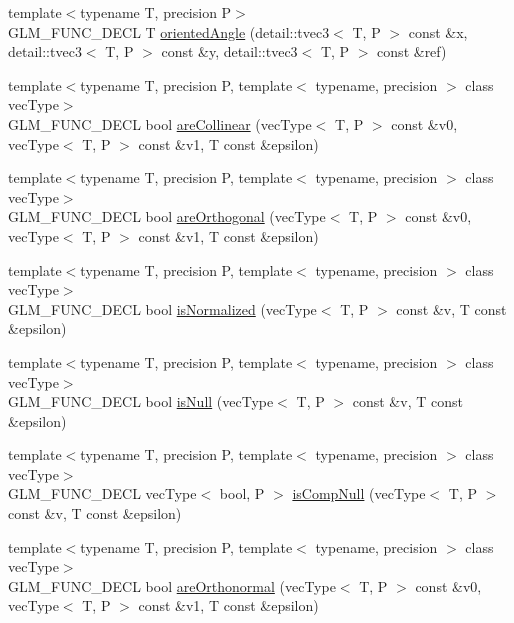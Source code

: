 \begin{CompactItemize}
\item 
{\footnotesize template$<$typename T, precision P$>$ }\\GLM\_\-FUNC\_\-DECL T \hyperlink{group__gtx__vector__angle_gc56a6bdc5d430b476514d64cb185b772}{orientedAngle} (detail::tvec3$<$ T, P $>$ const \&x, detail::tvec3$<$ T, P $>$ const \&y, detail::tvec3$<$ T, P $>$ const \&ref)
\item 
{\footnotesize template$<$typename T, precision P, template$<$ typename, precision $>$ class vecType$>$ }\\GLM\_\-FUNC\_\-DECL bool \hyperlink{group__gtx__vector__query_gbfc6fa0b52f1ad33ffe31d41535f7069}{areCollinear} (vecType$<$ T, P $>$ const \&v0, vecType$<$ T, P $>$ const \&v1, T const \&epsilon)
\item 
{\footnotesize template$<$typename T, precision P, template$<$ typename, precision $>$ class vecType$>$ }\\GLM\_\-FUNC\_\-DECL bool \hyperlink{group__gtx__vector__query_g9af1cd34fdb7c3cdeb11c0235fe7c468}{areOrthogonal} (vecType$<$ T, P $>$ const \&v0, vecType$<$ T, P $>$ const \&v1, T const \&epsilon)
\item 
{\footnotesize template$<$typename T, precision P, template$<$ typename, precision $>$ class vecType$>$ }\\GLM\_\-FUNC\_\-DECL bool \hyperlink{group__gtx__vector__query_g70f64c6df21ad40303809d76b1474fbe}{isNormalized} (vecType$<$ T, P $>$ const \&v, T const \&epsilon)
\item 
{\footnotesize template$<$typename T, precision P, template$<$ typename, precision $>$ class vecType$>$ }\\GLM\_\-FUNC\_\-DECL bool \hyperlink{group__gtx__vector__query_g368e458df5a70d885f5d8a87ec7b8ef8}{isNull} (vecType$<$ T, P $>$ const \&v, T const \&epsilon)
\item 
{\footnotesize template$<$typename T, precision P, template$<$ typename, precision $>$ class vecType$>$ }\\GLM\_\-FUNC\_\-DECL vecType$<$ bool, P $>$ \hyperlink{group__gtx__vector__query_g91e10972d2d748d78f0a5f6234f8b088}{isCompNull} (vecType$<$ T, P $>$ const \&v, T const \&epsilon)
\item 
{\footnotesize template$<$typename T, precision P, template$<$ typename, precision $>$ class vecType$>$ }\\GLM\_\-FUNC\_\-DECL bool \hyperlink{group__gtx__vector__query_g78e84684059effca3c44c549476db51a}{areOrthonormal} (vecType$<$ T, P $>$ const \&v0, vecType$<$ T, P $>$ const \&v1, T const \&epsilon)

\end{CompactItemize}

